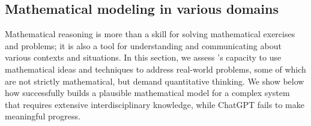 \subsection{Mathematical modeling in various domains}
\label{subsection:fm}

Mathematical reasoning is more than a skill for solving mathematical exercises and problems; it is also a tool for understanding and communicating about various contexts and situations. In this section, we assess {\DV}'s capacity to use mathematical ideas and techniques to address real-world problems, some of which are not strictly mathematical, but demand quantitative thinking. We show below how \DV successfully builds a plausible mathematical model for a complex system that requires extensive interdisciplinary knowledge, while ChatGPT fails to make meaningful progress.


